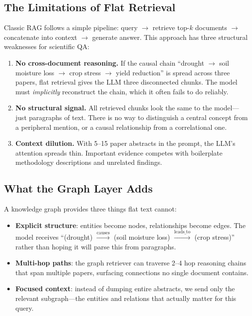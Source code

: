 \documentclass[11pt]{article}
\begin{document}
\subsection{The Limitations of Flat Retrieval}

Classic RAG follows a simple pipeline: query $\rightarrow$ retrieve top-$k$ documents $\rightarrow$ concatenate into context $\rightarrow$ generate answer. This approach has three structural weaknesses for scientific QA:

\begin{enumerate}[leftmargin=1.2em]
  \item \textbf{No cross-document reasoning.} If the causal chain ``drought $\rightarrow$ soil moisture loss $\rightarrow$ crop stress $\rightarrow$ yield reduction'' is spread across three papers, flat retrieval gives the LLM three disconnected chunks. The model must \emph{implicitly} reconstruct the chain, which it often fails to do reliably.
  \item \textbf{No structural signal.} All retrieved chunks look the same to the model---just paragraphs of text. There is no way to distinguish a central concept from a peripheral mention, or a causal relationship from a correlational one.
  \item \textbf{Context dilution.} With 5--15 paper abstracts in the prompt, the LLM's attention spreads thin. Important evidence competes with boilerplate methodology descriptions and unrelated findings.
\end{enumerate}

\subsection{What the Graph Layer Adds}

A knowledge graph provides three things flat text cannot:
\begin{itemize}[leftmargin=1.2em]
  \item \textbf{Explicit structure}: entities become nodes, relationships become edges. The model receives ``(drought) $\xrightarrow{\text{causes}}$ (soil moisture loss) $\xrightarrow{\text{leads\_to}}$ (crop stress)'' rather than hoping it will parse this from paragraphs.
  \item \textbf{Multi-hop paths}: the graph retriever can traverse 2--4 hop reasoning chains that span multiple papers, surfacing connections no single document contains.
  \item \textbf{Focused context}: instead of dumping entire abstracts, we send only the relevant subgraph---the entities and relations that actually matter for this query.
\end{itemize}
\end{document}
